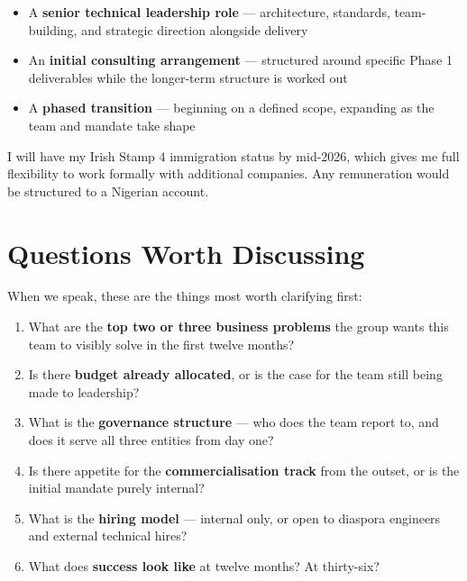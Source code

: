 \documentclass[10pt]{article}
\begin{document}
\small
\begin{itemize}[leftmargin=1.5em, itemsep=2pt]
  \item A \textbf{senior technical leadership role} --- architecture, standards,
        team-building, and strategic direction alongside delivery
  \item An \textbf{initial consulting arrangement} --- structured around specific
        Phase 1 deliverables while the longer-term structure is worked out
  \item A \textbf{phased transition} --- beginning on a defined scope,
        expanding as the team and mandate take shape
\end{itemize}
\normalsize

\vspace{4pt}
I will have my Irish Stamp 4 immigration status by mid-2026, which gives me
full flexibility to work formally with additional companies. Any remuneration
would be structured to a Nigerian account.

\vspace{6pt}

\section{Questions Worth Discussing}

When we speak, these are the things most worth clarifying first:

\small
\begin{enumerate}[leftmargin=1.8em, itemsep=3pt]
  \item What are the \textbf{top two or three business problems} the group
        wants this team to visibly solve in the first twelve months?
  \item Is there \textbf{budget already allocated}, or is the case for the team
        still being made to leadership?
  \item What is the \textbf{governance structure} --- who does the team report to,
        and does it serve all three entities from day one?
  \item Is there appetite for the \textbf{commercialisation track} from the outset,
        or is the initial mandate purely internal?
  \item What is the \textbf{hiring model} --- internal only, or open to
        diaspora engineers and external technical hires?
  \item What does \textbf{success look like} at twelve months? At thirty-six?
\end{enumerate}
\normalsize
\end{document}
